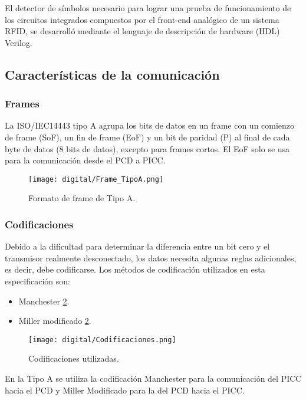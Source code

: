 El detector de símbolos necesario para lograr una prueba de funcionamiento de los circuitos integrados compuestos por el front-end analógico de un sistema RFID, se desarrolló mediante el lenguaje de descripción de hardware (HDL) Verilog.

\subsection{Características de la comunicación}

\subsubsection{Frames}
La ISO/IEC14443 tipo A agrupa los bits de datos en un frame con un comienzo de frame (SoF), un fin de frame (EoF) y un bit de paridad (P) al final de cada byte de datos (8 bits de datos), excepto para frames cortos. El EoF solo se usa para la comunicación desde el PCD a PICC.

\begin{figure}[H]
\centering
\texttt{[image: digital/Frame\_TipoA.png]}
\caption{Formato de frame de Tipo A.}
\label{fig:frame_A}
\end{figure}

\subsubsection{Codificaciones}
Debido a la dificultad para determinar la diferencia entre un bit cero y el transmisor realmente desconectado, los datos necesita algunas reglas adicionales, es decir, debe codificarse. Los métodos de codificación utilizados en esta especificación son:

\begin{itemize}
\item Manchester \ref{fig:coding_A}.
\item Miller modificado \ref{fig:coding_A}.
\end{itemize}

\begin{figure}[H]
\centering
\texttt{[image: digital/Codificaciones.png]}
\caption{Codificaciones utilizadas.}
\label{fig:coding_A}
\end{figure}

En la Tipo A se utiliza la codificación Manchester para la comunicación del PICC hacia el PCD y Miller Modificado para la del PCD hacia el PICC.

